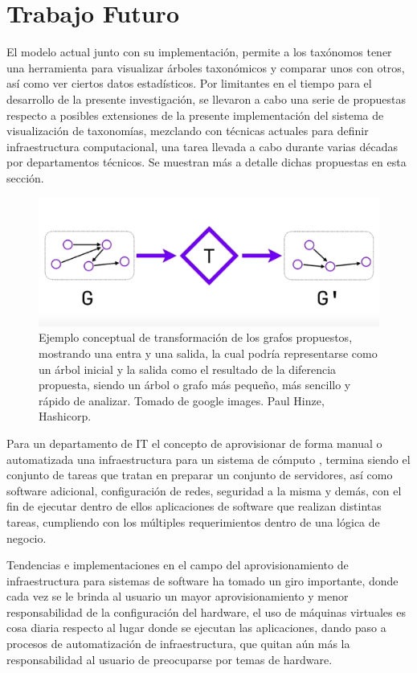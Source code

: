 \documentclass[journal]{IEEEtran}
\begin{document}
\section{Trabajo Futuro}

El modelo actual junto con su implementación, permite a los taxónomos tener una herramienta para visualizar árboles taxonómicos y comparar unos con otros, así como ver ciertos datos estadísticos. Por limitantes en el tiempo para el desarrollo de la presente investigación, se llevaron a cabo una serie de propuestas respecto a posibles extensiones de la presente implementación del sistema de visualización de taxonomías, mezclando con técnicas actuales para definir infraestructura computacional, una tarea llevada a cabo durante varias décadas por departamentos técnicos. Se muestran más a detalle dichas propuestas en esta sección.

\begin{figure}[]
  \centering
  \includegraphics[scale=0.9]{graph-theory.png}
  \caption{Ejemplo conceptual de transformación de los grafos propuestos, mostrando una entra y una salida, la cual podría representarse como un árbol inicial y la salida como el resultado de la diferencia propuesta, siendo un árbol o grafo más pequeño, más sencillo y rápido de analizar. Tomado de google images. Paul Hinze, Hashicorp.}
\end{figure}

Para un departamento de IT el concepto de aprovisionar de forma manual o automatizada una infraestructura para un sistema de cómputo \cite{aut-cloud-prov}, termina siendo el conjunto de tareas que tratan en preparar un conjunto de servidores, así como software adicional, configuración de redes, seguridad a la misma y demás, con el fin de ejecutar dentro de ellos aplicaciones de software que realizan distintas tareas, cumpliendo con los múltiples requerimientos dentro de una lógica de negocio.

Tendencias e implementaciones en el campo del aprovisionamiento de infraestructura para sistemas de software ha tomado un giro importante, donde cada vez se le brinda al usuario un mayor aprovisionamiento y menor responsabilidad de la configuración del hardware, el uso de máquinas virtuales \cite{virt-machines} es cosa diaria respecto al lugar donde se ejecutan las aplicaciones, dando paso a procesos de automatización de infraestructura, que quitan aún más la responsabilidad al usuario de preocuparse por temas de hardware.
\end{document}
